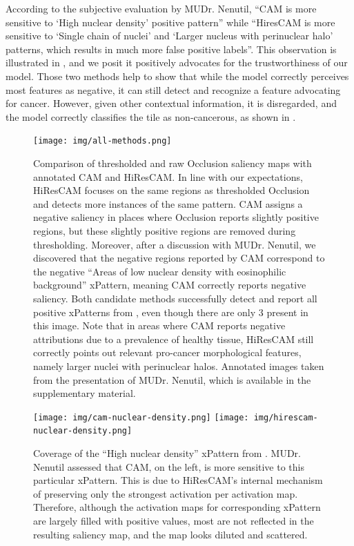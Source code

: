 According to the subjective evaluation by MUDr. Nenutil, ``CAM is more sensitive to `High nuclear density' positive pattern'' while ``HiresCAM is more sensitive to `Single chain of nuclei' and `Larger nucleus with perinuclear halo' patterns, which results in much more false positive labels''.
This observation is illustrated in , and we posit it positively advocates for the trustworthiness of our model. 
Those two methods help to show that while the model correctly perceives most features as negative, it can still detect and recognize a feature advocating for cancer.
However, given other contextual information, it is disregarded, and the model correctly classifies the tile as non-cancerous, as shown in .

\begin{figure}
    \centering
    \texttt{[image: img/all-methods.png]}
    \caption{
    Comparison of thresholded and raw Occlusion saliency maps with annotated CAM and HiResCAM.
    In line with our expectations, HiResCAM focuses on the same regions as thresholded Occlusion and detects more instances of the same pattern.
    CAM assigns a negative saliency in places where Occlusion reports slightly positive regions, but these slightly positive regions are removed during thresholding.
    Moreover, after a discussion with MUDr. Nenutil, we discovered that the negative regions reported by CAM correspond to the negative ``Areas of low nuclear density with eosinophilic background'' xPattern, meaning CAM correctly reports negative saliency.
    Both candidate methods successfully detect and report all positive xPatterns from \cite{gallo}, even though there are only $3$ present in this image.
    Note that in areas where CAM reports negative attributions due to a prevalence of healthy tissue, HiResCAM still correctly points out relevant pro-cancer morphological features, namely larger nuclei with perinuclear halos.
    Annotated images taken from the presentation of MUDr. Nenutil, which is available in the supplementary material.
    }
    \label{fig:both-pos}
\end{figure}

\begin{figure}
    \begin{center}
    \begin{minipage}{1\textwidth}
      {\texttt{[image: img/cam-nuclear-density.png]}
      \texttt{[image: img/hirescam-nuclear-density.png]}}
    \end{minipage}
    \caption{
    Coverage of the ``High nuclear density'' xPattern from \cite{gallo}.
    MUDr. Nenutil assessed that CAM, on the left, is more sensitive to this particular xPattern.
    This is due to HiResCAM's internal mechanism of preserving only the strongest activation per activation map.
    Therefore, although the activation maps for corresponding xPattern are largely filled with positive values, most are not reflected in the resulting saliency map, and the map looks diluted and scattered.
    }
    \label{fig:both-nuclear-density}
    \end{center}
\end{figure}

